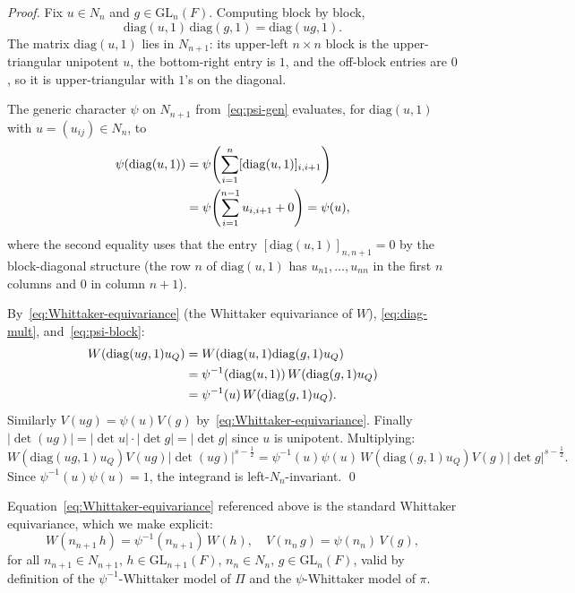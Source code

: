 \documentclass[12pt]{article}
\theoremstyle{definition}
\begin{document}
\begin{proof}
Fix $u\in N_n$ and $g\in\mathrm{GL}_n(F)$. Computing block by block,
\begin{equation}\label{eq:diag-mult}
\mathrm{diag}(u,1)\,\mathrm{diag}(g,1)=\mathrm{diag}(ug,1).
\end{equation}
The matrix $\mathrm{diag}(u,1)$ lies in $N_{n+1}$: its upper-left $n\times n$ block is the upper-triangular unipotent $u$, the bottom-right entry is $1$, and the off-block entries are $0$, so it is upper-triangular with $1$'s on the diagonal.

The generic character $\psi$ on $N_{n+1}$ from~\eqref{eq:psi-gen} evaluates, for $\mathrm{diag}(u,1)$ with $u=(u_{ij})\in N_n$, to
\begin{align}
\psi(\mathrm{diag}(u,1))&=\psi\!\left(\sum_{i=1}^{n}[\mathrm{diag}(u,1)]_{i,i+1}\right)\notag\\
&=\psi\!\left(\sum_{i=1}^{n-1}u_{i,i+1}+0\right)=\psi(u),\label{eq:psi-block}
\end{align}
where the second equality uses that the entry $[\mathrm{diag}(u,1)]_{n,n+1}=0$ by the block-diagonal structure (the row $n$ of $\mathrm{diag}(u,1)$ has $u_{n1},\ldots,u_{nn}$ in the first $n$ columns and $0$ in column $n+1$).

By~\eqref{eq:Whittaker-equivariance} (the Whittaker equivariance of $W$), \eqref{eq:diag-mult}, and~\eqref{eq:psi-block}:
\begin{align}\label{eq:W-shift}
W(\mathrm{diag}(ug,1)u_Q)&=W(\mathrm{diag}(u,1)\mathrm{diag}(g,1)u_Q)\\
&=\psi^{-1}(\mathrm{diag}(u,1))\,W(\mathrm{diag}(g,1)u_Q)\notag\\
&=\psi^{-1}(u)\,W(\mathrm{diag}(g,1)u_Q).\notag
\end{align}
Similarly $V(ug)=\psi(u)V(g)$ by~\eqref{eq:Whittaker-equivariance}. Finally $|\det(ug)|=|\det u|\cdot|\det g|=|\det g|$ since $u$ is unipotent. Multiplying:
$$W(\mathrm{diag}(ug,1)u_Q)V(ug)|\det(ug)|^{s-\tfrac12}=\psi^{-1}(u)\psi(u)\,W(\mathrm{diag}(g,1)u_Q)V(g)|\det g|^{s-\tfrac12}.$$
Since $\psi^{-1}(u)\psi(u)=1$, the integrand is left-$N_n$-invariant. \qed
\end{proof}

Equation~\eqref{eq:Whittaker-equivariance} referenced above is the standard Whittaker equivariance, which we make explicit:
\begin{equation}\label{eq:Whittaker-equivariance}
W(n_{n+1}\,h)=\psi^{-1}(n_{n+1})\,W(h),\quad V(n_n\,g)=\psi(n_n)\,V(g),
\end{equation}
for all $n_{n+1}\in N_{n+1},\,h\in\mathrm{GL}_{n+1}(F)$, $n_n\in N_n,\,g\in\mathrm{GL}_n(F)$, valid by definition of the $\psi^{-1}$-Whittaker model of $\Pi$ and the $\psi$-Whittaker model of $\pi$.
\end{document}
